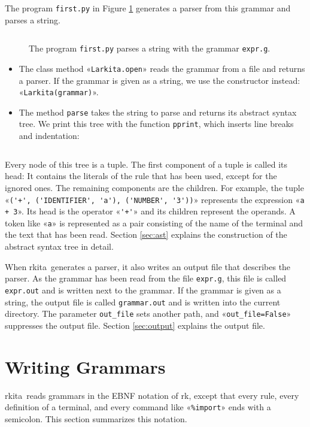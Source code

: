 \documentclass[11pt,a4paper]{article}
\makeatletter
\newcommand{\blue}[1]{{\color{blue}#1}}
\newcommand{\fakesc}[1]{\resizebox{!}{0.99ex}{\textls[90]{\MakeUppercase{#1}}}}
\def\@simtextsc#1#2\@nil{\MakeUppercase{#1}\fakesc{#2}}
\newcommand{\simtextsc}[1]{%
  \ifmmode\text{\@simtextsc#1\@nil}\else\@simtextsc#1\@nil\fi}
\newcommand{\Larkita}{\simtextsc{Larkita}}
\newcommand{\Lark}{\simtextsc{Lark}}
\newenvironment{unbreakable}{\par\noindent\begin{minipage}{\linewidth}}{\end{minipage}\par}
\newcommand{\codefigure}[5][]{\begin{figure}[H]%
  \inputminted[numbers = left, numbersep = 0.3cm, #1]{#2}{examples/#3}%
  \vspace*{-0.3cm}%
  \caption{#5}\label{#4}\end{figure}}
\newcommand{\pythonfile}[2]{\codefigure{python3}{#1}{fig:#1}{#2}}
\newcommand{\resultfile}[2][\normalsize]{\begin{unbreakable}%
  \inputminted[fontsize = #1, breaklines]{text}{examples/output/#2.txt}\end{unbreakable}}
\makeatother
\begin{document}
The program \texttt{first.py} in Figure \ref{fig:first.py} generates a parser from this grammar and parses a
string.
\pythonfile{first.py}{The program \texttt{first.py} parses a string with the grammar \texttt{expr.g}.}
\begin{itemize}
\item The class method «\verb|Larkita.open|» reads the grammar from a file and returns a parser.  If the grammar
      is given as a string, we use the constructor instead:  «\verb|Larkita(grammar)|».
\item The method \texttt{parse} takes the string to parse and returns its abstract syntax tree.  We print this
      tree with the function \texttt{pprint}, which inserts line breaks and indentation:
\end{itemize}
\resultfile{first}
Every node of this tree is a tuple.  The first component of a tuple is called its \blue{head}: It contains the
literals of the rule that has been used, except for the ignored ones.  The remaining components are the \blue{children}.  For example, the
tuple «\verb|('+', ('IDENTIFIER', 'a'), ('NUMBER', '3'))|» represents the expression «\verb|a + 3|».  Its head is
the operator «\verb|'+'|» and its children represent the operands.  A token like «\texttt{a}» is represented as a
pair consisting of the name of the terminal and the text that has been read.  Section \ref{sec:ast} explains
the construction of the abstract syntax tree in detail.

When \Larkita\ generates a parser, it also writes an output file that describes the parser.  As the grammar
has been read from the file \texttt{expr.g}, this file is called \texttt{expr.out} and is written next to the
grammar.  If the grammar is given as a string, the output file is called \texttt{grammar.out} and is written
into the current directory.  The parameter \texttt{out\_file} sets another path, and «\verb|out_file=False|»
suppresses the output file.  Section \ref{sec:output} explains the output file.

\section{Writing Grammars}
\Larkita\ reads grammars in the EBNF notation of \Lark, except that every rule, every definition of a
terminal, and every command like «\verb|%import|» ends with a semicolon.  This section summarizes this
notation.
\end{document}
